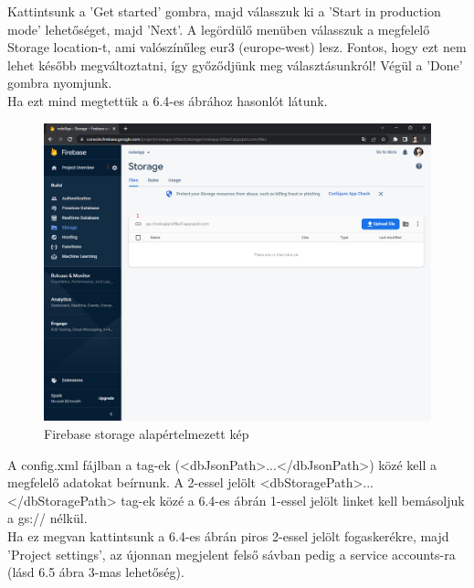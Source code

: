 \noindent Kattintsunk a 'Get started' gombra, majd válasszuk ki a 'Start in production mode' lehetőséget, majd 'Next'. A legördülő menüben válasszuk a megfelelő Storage location-t, ami valószínűleg eur3 (europe-west) lesz. Fontos, hogy ezt nem lehet később megváltoztatni, így győződjünk meg választásunkról! Végül a 'Done' gombra nyomjunk.
\vspace{5pt}\\Ha ezt mind megtettük a 6.4-es ábrához hasonlót látunk.

\begin{figure}[h]
	\centering
	\includegraphics[scale=0.2]{images/config_4.png}
	\caption{Firebase storage alapértelmezett kép}
	\label{fig:firebase_storage_default}
\end{figure}







\noindent A config.xml fájlban a tag-ek (<dbJsonPath>...</dbJsonPath>) közé kell a megfelelő adatokat beírnunk. A 2-essel jelölt <dbStoragePath>...</dbStoragePath> tag-ek közé a 6.4-es ábrán 1-essel jelölt linket kell bemásoljuk a gs:// nélkül.
\vspace{5pt}\\Ha ez megvan kattintsunk a 6.4-es ábrán piros 2-essel jelölt fogaskerékre, majd 'Project settings', az újonnan megjelent felső sávban pedig a service accounts-ra (lásd 6.5 ábra 3-mas lehetőség).

